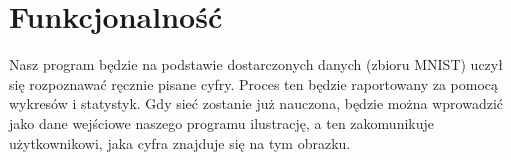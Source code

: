 \section{Funkcjonalność}

Nasz program będzie na podstawie dostarczonych danych (zbioru MNIST) uczył się rozpoznawać ręcznie pisane cyfry. Proces ten będzie raportowany za pomocą wykresów i statystyk. Gdy sieć zostanie już nauczona, będzie można wprowadzić jako dane wejściowe naszego programu ilustrację, a ten zakomunikuje użytkownikowi, jaka cyfra znajduje się na tym obrazku.